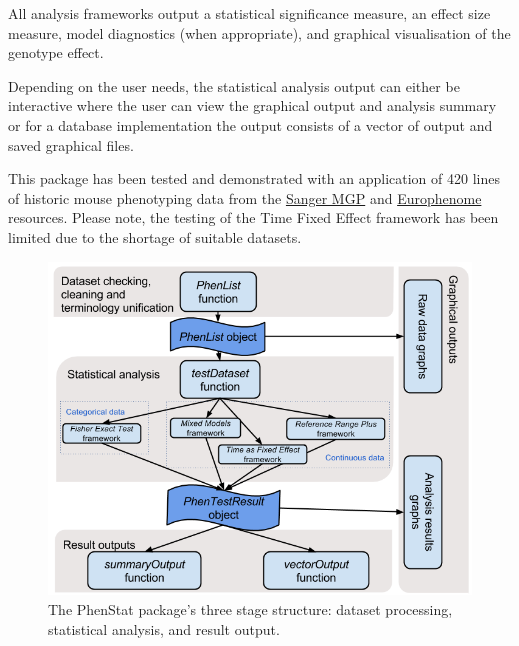 \documentclass[12pt,a4paper]{article}
\begin{document}
All analysis frameworks output a statistical significance measure, an effect size measure, model diagnostics (when appropriate), and graphical visualisation of the genotype effect. 

Depending on the user needs, the statistical analysis output can either be interactive where the user can view the graphical output and analysis summary or for a database implementation the output consists of a vector of output and saved graphical files. 

This package has been tested and demonstrated with an application of 420 lines of historic mouse phenotyping data from the  \href{http://www.sanger.ac.uk/mouseportal/}{Sanger MGP} and \href{http://www.europhenome.org/}{Europhenome} resources. Please note, the testing of the Time Fixed Effect framework has been limited due to the shortage of suitable datasets.
\\

\begin{figure}[!htpb]%
\centerline{\includegraphics[scale=0.5]{PhenStat_simple.png}}
\caption{The PhenStat package's three stage structure: dataset processing, statistical analysis, and result output.}\label{fig:01}
\end{figure}
\end{document}
